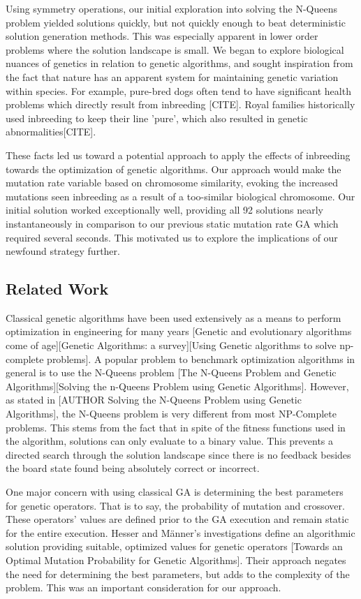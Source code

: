\documentclass{sig-alternate}
\begin{document}
Using symmetry operations, our initial exploration into solving the N-Queens problem yielded solutions quickly, but not quickly enough to beat deterministic solution generation methods. This was especially apparent in lower order problems where the solution landscape is small. We began to explore biological nuances of genetics in relation to genetic algorithms, and sought inspiration from the fact that nature has an apparent system for maintaining genetic variation within species. For example, pure-bred dogs often tend to have significant health problems which directly result from inbreeding [CITE]. Royal families historically used inbreeding to keep their line 'pure', which also resulted in genetic abnormalities[CITE].

These facts led us toward a potential approach to apply the effects of inbreeding towards the optimization of genetic algorithms. Our approach would make the mutation rate variable based on chromosome similarity, evoking the increased mutations seen inbreeding as a result of a too-similar biological chromosome. Our initial solution worked exceptionally well, providing all 92 solutions nearly instantaneously in comparison to our previous static mutation rate GA which required several seconds. This motivated us to explore the implications of our newfound strategy further.

\subsection{Related Work}

Classical genetic algorithms have been used extensively as a means to perform optimization in engineering for many years [Genetic and evolutionary algorithms come of age][Genetic Algorithms: a survey][Using Genetic algorithms to solve np-complete problems]. A popular problem to benchmark optimization algorithms in general is to use the N-Queens problem [The N-Queens Problem and Genetic Algorithms][Solving the n-Queens Problem using Genetic Algorithms]. However, as stated in [AUTHOR Solving the N-Queens Problem using Genetic Algorithms], the N-Queens problem is very different from most NP-Complete problems. This stems from the fact that in spite of the fitness functions used in the algorithm, solutions can only evaluate to a binary value. This prevents a directed search through the solution landscape since there is no feedback besides the board state found being absolutely correct or incorrect. 

One major concern with using classical GA is determining the best parameters for genetic operators. That is to say, the probability of mutation and crossover. These operators' values are defined prior to the GA execution and remain static for the entire execution. Hesser and Männer's investigations define an algorithmic solution providing suitable, optimized values for genetic operators [Towards an Optimal Mutation Probability for Genetic Algorithms]. Their approach negates the need for determining the best parameters, but adds to the complexity of the problem. This was an important consideration for our approach.
\end{document}

